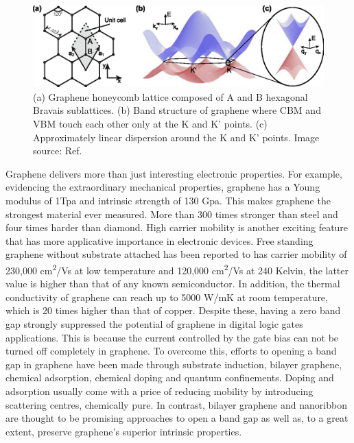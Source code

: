 \begin{figure}[htbp!] 
\centering  
\includegraphics[width=\textwidth]{gra_lat_band.eps}
\caption[Graphene lattice and band structure.]{(a) Graphene honeycomb lattice composed of A and B hexagonal Bravais sublattices. (b) Band structure of graphene where CBM and VBM touch each other only at the K and K' points. (c) Approximately linear dispersion around the K and K' points. Image source: Ref. \cite{Guttinger2012} }  
\label{fig:gra_band}
\end{figure} 

Graphene delivers more than just interesting electronic properties. For example, evidencing the extraordinary mechanical properties, graphene has a Young modulus of 1Tpa and intrinsic strength of 130 Gpa\cite{Lee385}. This makes graphene the strongest material ever measured. More than 300 times stronger than steel and four times harder than diamond. High carrier mobility is another exciting feature that has more applicative importance in electronic devices. Free standing graphene without substrate attached has been reported to has carrier mobility of 230,000 \si{cm^2/Vs} at low temperature\cite{Bolotin2008a} and 120,000 \si{cm^2/Vs} at 240 Kelvin, the latter value is higher than that of any known semiconductor\cite{Bolotin2008b}. In addition, the thermal conductivity of graphene can reach up to 5000 \si{W/mK} at room temperature, which is 20 times higher than that of copper\cite{Alexander2008}. Despite these, having a zero band gap strongly suppressed the potential of graphene in digital logic gates applications. This is because the current controlled by the gate bias can not be turned off completely in graphene. To overcome this, efforts to opening a band gap in graphene have been made through substrate induction\cite{Ci2010,zhou2007}, bilayer graphene\cite{mccann2006,castro2007}, chemical adsorption\cite{Elias2009,Jeon2011}, chemical doping\cite{zhou2008} and quantum confinements\cite{Nakada1996,Barone2006}.  Doping and adsorption usually come with a price of reducing mobility by introducing scattering centres, chemically pure. In contrast, bilayer graphene and nanoribbon are thought to be promising approaches to open a band gap as well as, to a great extent, preserve graphene's superior intrinsic properties.

